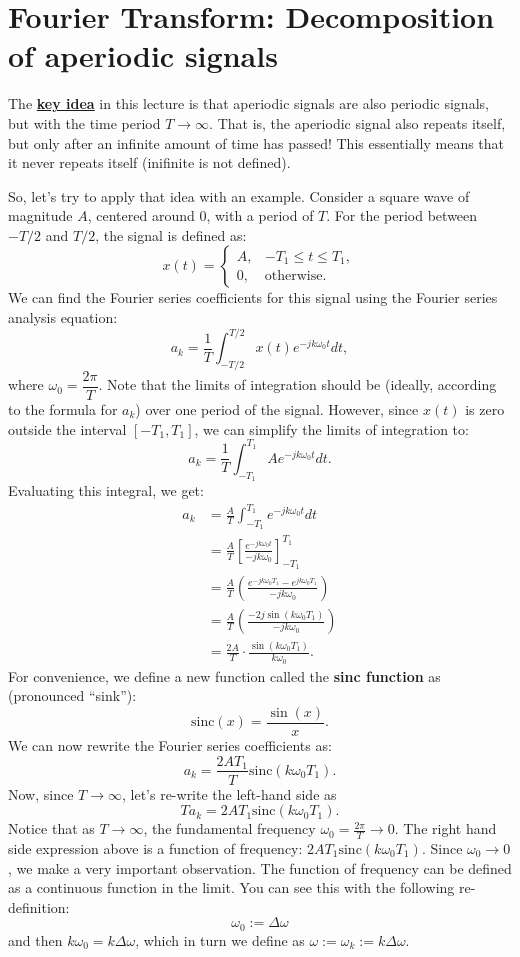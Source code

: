 \documentclass{ee102_notes}
\begin{document}
\section{Fourier Transform: Decomposition of aperiodic signals}

The \ul{\textbf{key idea}} in this lecture is that aperiodic signals are also periodic signals, but with the time period $T \to \infty$. That is, the aperiodic signal also repeats itself, but only after an infinite amount of time has passed! This essentially means that it never repeats itself (inifinite is not defined).

So, let's try to apply that idea with an example. Consider a square wave of magnitude $A$, centered around 0, with a period of $T$. For the period between $-T/2$ and $T/2$, the signal is defined as:
\[
x(t) = \begin{cases}
A, & -T_1 \le t \le T_1,\\
0, & \text{otherwise.}
\end{cases}
\]
We can find the Fourier series coefficients for this signal using the Fourier series analysis equation:
\[
a_k = \frac{1}{T} \int_{-T/2}^{T/2} x(t) e^{-jk\omega_0 t} dt,
\]
where $\omega_0 = \dfrac{2\pi}{T}$. Note that the limits of integration should be (ideally, according to the formula for $a_k$) over one period of the signal. However, since $x(t)$ is zero outside the interval $[-T_1, T_1]$, we can simplify the limits of integration to:
\[
a_k = \frac{1}{T} \int_{-T_1}^{T_1} A e^{-jk\omega_0 t} dt.
\]
Evaluating this integral, we get:
\begin{align*}
    a_k &= \frac{A}{T} \int_{-T_1}^{T_1} e^{-jk\omega_0 t} dt \\
    &= \frac{A}{T} \left[ \frac{e^{-jk\omega_0 t}}{-jk\omega_0} \right]_{-T_1}^{T_1} \\
    &= \frac{A}{T} \left( \frac{e^{-jk\omega_0 T_1} - e^{jk\omega_0 T_1}}{-jk\omega_0} \right) \\
    &= \frac{A}{T} \left( \frac{-2j \sin(k\omega_0 T_1)}{-jk\omega_0} \right) \\
    &= \frac{2A}{T} \cdot \frac{\sin(k\omega_0 T_1)}{k\omega_0}.
\end{align*}
For convenience, we define a new function called the \textbf{sinc function} as (pronounced ``sink''):
\[
\textrm{sinc}(x) = \frac{\sin(x)}{x}.
\]
We can now rewrite the Fourier series coefficients as:
\[
a_k = \frac{2A T_1}{T} \textrm{sinc}(k\omega_0 T_1).
\]
Now, since $T \to \infty$, let's re-write the left-hand side as 
\[
T a_k = 2AT_1 \textrm{sinc}(k\omega_0 T_1).
\]
Notice that as $T \to \infty$, the fundamental frequency $\omega_0 = \frac{2\pi}{T} \to 0$. The right hand side expression above is a function of frequency: $2A T_1 \textrm{sinc}(k\omega_0 T_1)$. Since $\omega_0 \to 0$, we make a very important observation. The function of frequency can be defined as a continuous function in the limit. You can see this with the following re-definition:
\[
\omega_0 := \Delta \omega 
\] 
and then $k \omega_0 = k \Delta \omega$, which in turn we define as $\omega := \omega_k := k \Delta \omega$.
\end{document}
